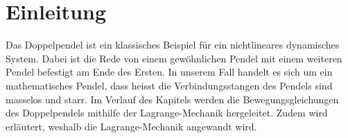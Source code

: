 
\section{Einleitung}
Das Doppelpendel ist ein klassisches Beispiel für ein nichtlineares dynamisches System.
Dabei ist die Rede von einem gewöhnlichen Pendel mit einem weiteren Pendel
befestigt am Ende des Ersten.
In unserem Fall handelt es sich um ein mathematisches Pendel, dass heisst
die Verbindungsstangen des Pendels sind masselos und starr.
Im Verlauf des Kapitels werden die Bewegungsgleichungen des Doppelpendels
mithilfe der Lagrange-Mechanik hergeleitet.
Zudem wird erläutert, weshalb die Lagrange-Mechanik angewandt wird.